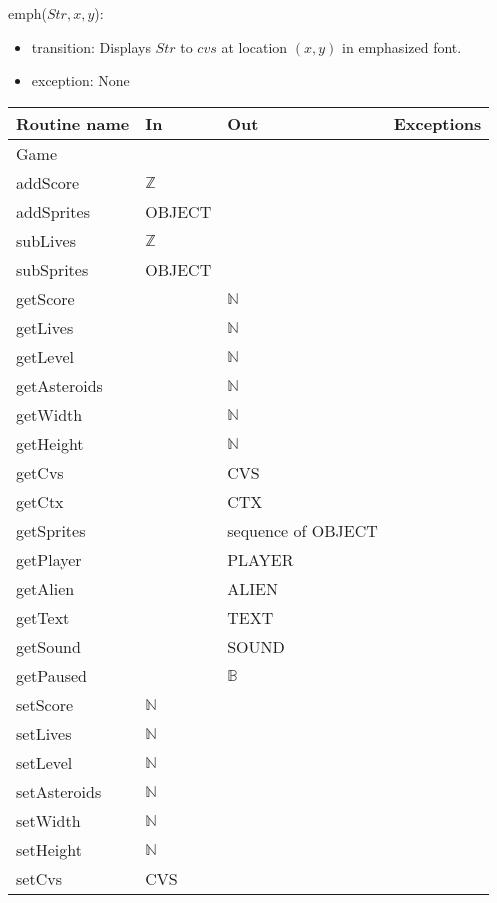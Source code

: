 \documentclass[12pt]{article}
\begin{document}
\noindent emph($Str,x,y$):
\begin{itemize}
    \item transition: Displays $Str$ to $cvs$ at location $(x,y)$ in emphasized font.
    \item exception: None
\end{itemize}

\newpage %

\begin{tabular}{| l | l | l | l |}
\hline
\textbf{Routine name} & \textbf{In} & \textbf{Out} & \textbf{Exceptions}\\
\hline
Game &  & ~\\
\hline
addScore & $\mathbb{Z}$ &  & ~\\
\hline
addSprites & OBJECT &  & ~\\
\hline
subLives & $\mathbb{Z}$ &  & ~\\
\hline
subSprites & OBJECT &  & ~\\
\hline
getScore &  & $\mathbb{N}$  & ~\\
\hline
getLives &  & $\mathbb{N}$  & ~\\
\hline
getLevel &  & $\mathbb{N}$  & ~\\
\hline
getAsteroids &  & $\mathbb{N}$  & ~\\
\hline
getWidth &  & $\mathbb{N}$  & ~\\
\hline
getHeight &  & $\mathbb{N}$  & ~\\
\hline
getCvs &  & CVS  & ~\\
\hline
getCtx &  & CTX  & ~\\
\hline
getSprites &  & sequence of OBJECT  & ~\\
\hline
getPlayer &  & PLAYER  & ~\\
\hline
getAlien &  & ALIEN  & ~\\
\hline
getText &  & TEXT  & ~\\
\hline
getSound &  & SOUND  & ~\\
\hline
getPaused &  & $\mathbb{B}$  & ~\\
\hline
setScore & $\mathbb{N}$ &  & ~\\
\hline
setLives & $\mathbb{N}$ &  & ~\\
\hline
setLevel & $\mathbb{N}$ &  & ~\\
\hline
setAsteroids & $\mathbb{N}$ &  & ~\\
\hline
setWidth & $\mathbb{N}$ &  & ~\\
\hline
setHeight & $\mathbb{N}$ &  & ~\\
\hline
setCvs & CVS &  & ~\\

\end{tabular}
\end{document}
